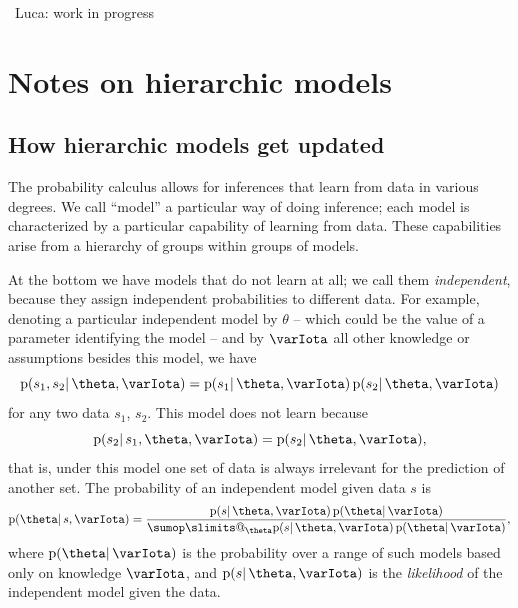 \documentclass[\ifafour a4paper,12pt,\else a5paper,10pt,\fi%
onecolumn,oneside,article,%
british%
]{memoir}
\makeatletter
\theoremstyle{remark}
\theoremstyle{innote}
\def\sum{\DOTSI\sumop\slimits@}
\newcommand*{\pf}{\mathrm{p}}%
\renewcommand*{\|}{\mathpunct{|}}
\newcommand*{\puzzle}{\maltese}
\newcommand{\mynote}[1]{ {\color{notecolour}\puzzle\ #1\ }}
\newcommand*{\yI}{\varIota}
\newcommand*{\yth}{\theta}
\makeatother
\begin{document}




\mynote{Luca: work in progress}

\clearpage

\section{Notes on hierarchic models}
\label{sec:notes_hierarchic}

\subsection{How hierarchic models get updated}
\label{sec:hierarchic_models}

The probability calculus allows for inferences that learn from data in
various degrees. We call \enquote{model} a particular way of doing
inference; each model is characterized by a particular capability of
learning from data. These capabilities arise from a hierarchy of groups
within groups of models.

At the bottom we have models that do not learn at all; we call them
\emph{independent}, because they assign independent probabilities to
different data. For example, denoting a particular independent model by
$\yth$ -- which could be the value of a parameter identifying the model --
and by $\yI$ all other knowledge or assumptions besides this model, we have
\begin{equation}
  \label{eq:indep_model}
  \pf(s_1,s_2 \| \yth, \yI) = \pf(s_1 \|\yth,\yI) \, \pf(s_2 \|\yth,\yI)
\end{equation}
for any two data $s_1$, $s_2$. This model does not learn because
\begin{equation}
  \label{eq:indep_model_nolearn}
  \pf(s_2\| s_1, \yth, \yI) = \pf(s_2 \|\yth,\yI),
\end{equation}
that is, under this model one set of data is always irrelevant for the
prediction of another set. The probability of an independent model given
data $s$ is
\begin{equation}
  \label{eq:prob_indep_model}
  \pf(\yth \| s, \yI)
  = \frac{
    \pf(s \|\yth,\yI) \, \pf(\yth \| \yI)
  }{
    \sum_{\yth}\pf(s \|\yth,\yI) \, \pf(\yth \| \yI)
  },
\end{equation}
where $\pf(\yth \|\yI)$ is the probability over a range of such models
based only on knowledge $\yI$, and $\pf(s \|\yth,\yI)$ is the
\emph{likelihood} of the independent model given the data.
\end{document}
